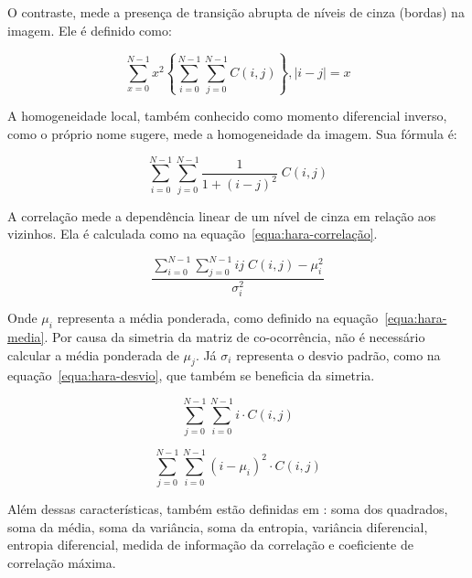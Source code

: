 O contraste, mede a presença de transição abrupta de níveis de cinza (bordas) na imagem. Ele é definido como:

\begin{equation}
 \sum_{x=0}^{N-1} x^2 \left\{\sum_{i=0}^{N-1}\sum_{j=0}^{N-1} C(i,j)\right\},|i - j| = x
 \label{equa:hara-contraste}
\end{equation}

A homogeneidade local, também conhecido como momento diferencial inverso, como o próprio nome sugere, mede a homogeneidade da imagem. Sua fórmula é:

\begin{equation}
 \sum_{i=0}^{N-1}\sum_{j=0}^{N-1} \frac{1}{1 + (i - j)^2} \;C(i,j)
 \label{equa:hara-homogeneidade}
\end{equation}

A correlação mede a dependência linear de um nível de cinza em relação aos vizinhos. Ela é calculada como na equação~\ref{equa:hara-correlação}.

\begin{equation}
 \frac{\sum\limits_{i=0}^{N-1}\sum\limits_{j=0}^{N-1} i j\; C(i,j) - \mu_{i}^2}{\sigma_{i}^2}
 \label{equa:hara-correlação}
\end{equation}

Onde $\mu_{i}$ representa a média ponderada, como definido na equação~\ref{equa:hara-media}. Por causa da simetria da matriz de co-ocorrência, não é necessário calcular a média ponderada de $\mu_{j}$. Já $\sigma_{i}$ representa o desvio padrão, como na equação~\ref{equa:hara-desvio}, que também se beneficia da simetria.

\begin{equation}
 \sum_{j=0}^{N-1}\sum_{i=0}^{N-1} i \cdot C(i, j)
 \label{equa:hara-media}
\end{equation}

\begin{equation}
 \sum_{j=0}^{N-1}\sum_{i=0}^{N-1} (i - \mu_{i})^2 \cdot C(i, j)
 \label{equa:hara-desvio}
\end{equation}

Além dessas características, também estão definidas em \cite{Haralick}: soma dos quadrados, soma da média, soma da variância, soma da entropia, variância diferencial, entropia diferencial, medida de informação da correlação e coeficiente de correlação máxima.
